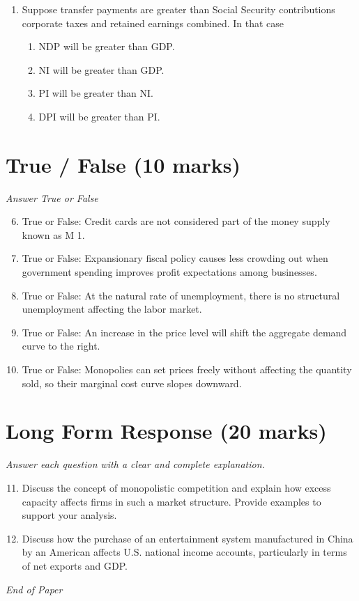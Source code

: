 \documentclass[12pt]{article}
\begin{document}
\begin{enumerate}[label=\arabic*.]
\begin{enumerate}[label=(\alph*)]
    \item Increasing marginal utility.
    \item Increasing marginal productivity.
\end{enumerate}
\item Suppose transfer payments are greater than Social Security contributions corporate taxes and retained earnings combined. In that case
\begin{enumerate}[label=(\alph*)]
    \item NDP will be greater than GDP.
    \item NI will be greater than GDP.
    \item PI will be greater than NI.
    \item DPI will be greater than PI.
\end{enumerate}
\end{enumerate}

\section*{True / False (10 marks)}
\textit{Answer True or False}
\begin{enumerate}[label=\arabic*.]
\setcounter{enumi}{5}
\item True or False: Credit cards are not considered part of the money supply known as M 1.
\item True or False: Expansionary fiscal policy causes less crowding out when government spending improves profit expectations among businesses.
\item True or False: At the natural rate of unemployment, there is no structural unemployment affecting the labor market.
\item True or False: An increase in the price level will shift the aggregate demand curve to the right.
\item True or False: Monopolies can set prices freely without affecting the quantity sold, so their marginal cost curve slopes downward.
\end{enumerate}

\section*{Long Form Response (20 marks)}
\textit{Answer each question with a clear and complete explanation.}
\begin{enumerate}[label=\arabic*.]
\setcounter{enumi}{10}
\item Discuss the concept of monopolistic competition and explain how excess capacity affects firms in such a market structure. Provide examples to support your analysis.
\item Discuss how the purchase of an entertainment system manufactured in China by an American affects U.S. national income accounts, particularly in terms of net exports and GDP.
\end{enumerate}

\vfill
\noindent\textit{End of Paper}
\end{document}
